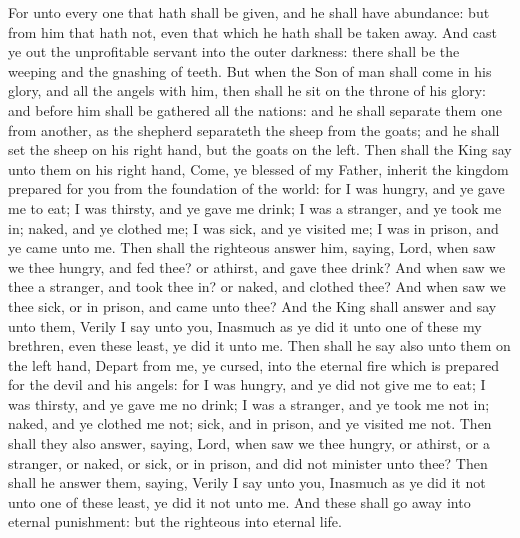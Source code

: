 For unto every one that hath shall be given, and he shall have abundance: but from him that hath not, even that which he hath shall be taken away. And cast ye out the unprofitable servant into the outer darkness: there shall be the weeping and the gnashing of teeth.  But when the Son of man shall come in his glory, and all the angels with him, then shall he sit on the throne of his glory: and before him shall be gathered all the nations: and he shall separate them one from another, as the shepherd separateth the sheep from the goats; and he shall set the sheep on his right hand, but the goats on the left. Then shall the King say unto them on his right hand, Come, ye blessed of my Father, inherit the kingdom prepared for you from the foundation of the world: for I was hungry, and ye gave me to eat; I was thirsty, and ye gave me drink; I was a stranger, and ye took me in; naked, and ye clothed me; I was sick, and ye visited me; I was in prison, and ye came unto me. Then shall the righteous answer him, saying, Lord, when saw we thee hungry, and fed thee? or athirst, and gave thee drink? And when saw we thee a stranger, and took thee in? or naked, and clothed thee? And when saw we thee sick, or in prison, and came unto thee? And the King shall answer and say unto them, Verily I say unto you, Inasmuch as ye did it unto one of these my brethren, even these least, ye did it unto me. Then shall he say also unto them on the left hand, Depart from me, ye cursed, into the eternal fire which is prepared for the devil and his angels: for I was hungry, and ye did not give me to eat; I was thirsty, and ye gave me no drink; I was a stranger, and ye took me not in; naked, and ye clothed me not; sick, and in prison, and ye visited me not. Then shall they also answer, saying, Lord, when saw we thee hungry, or athirst, or a stranger, or naked, or sick, or in prison, and did not minister unto thee? Then shall he answer them, saying, Verily I say unto you, Inasmuch as ye did it not unto one of these least, ye did it not unto me. And these shall go away into eternal punishment: but the righteous into eternal life. 


